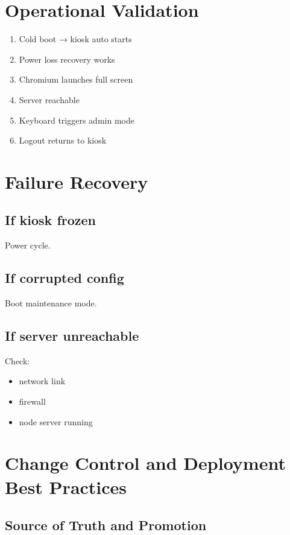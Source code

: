\documentclass[11pt,letterpaper]{article}
\begin{document}
\section{Operational Validation}

\begin{enumerate}
\item Cold boot → kiosk auto starts
\item Power loss recovery works
\item Chromium launches full screen
\item Server reachable
\item Keyboard triggers admin mode
\item Logout returns to kiosk
\end{enumerate}

\section{Failure Recovery}

\subsection{If kiosk frozen}

Power cycle.

\subsection{If corrupted config}

Boot maintenance mode.

\subsection{If server unreachable}

Check:
\begin{itemize}
\item network link
\item firewall
\item node server running
\end{itemize}

\section{Change Control and Deployment Best Practices}

\subsection{Source of Truth and Promotion}
\end{document}
